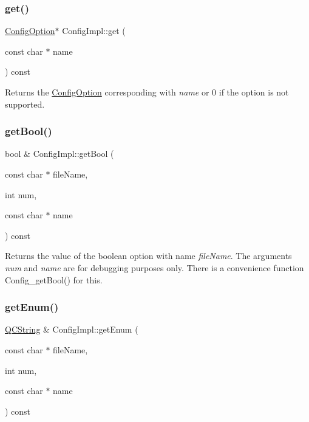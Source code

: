 \subsubsection{\texorpdfstring{get()}{get()}}
{\footnotesize\ttfamily \mbox{\hyperlink{class_config_option}{Config\+Option}}$\ast$ Config\+Impl\+::get (\begin{DoxyParamCaption}\item[{const char $\ast$}]{name }\end{DoxyParamCaption}) const\hspace{0.3cm}{\ttfamily [inline]}}

Returns the \mbox{\hyperlink{class_config_option}{Config\+Option}} corresponding with {\itshape name} or 0 if the option is not supported. \mbox{\label{class_config_impl_ad598f15be45d231f792b68314f7b0468}} 
\subsubsection{\texorpdfstring{getBool()}{getBool()}}
{\footnotesize\ttfamily bool \& Config\+Impl\+::get\+Bool (\begin{DoxyParamCaption}\item[{const char $\ast$}]{file\+Name,  }\item[{int}]{num,  }\item[{const char $\ast$}]{name }\end{DoxyParamCaption}) const}

Returns the value of the boolean option with name {\itshape file\+Name}. The arguments {\itshape num} and {\itshape name} are for debugging purposes only. There is a convenience function Config\+\_\+get\+Bool() for this. \mbox{\label{class_config_impl_a5c8800850fd2447c50f320ffb4ee0357}} 
\subsubsection{\texorpdfstring{getEnum()}{getEnum()}}
{\footnotesize\ttfamily \mbox{\hyperlink{class_q_c_string}{Q\+C\+String}} \& Config\+Impl\+::get\+Enum (\begin{DoxyParamCaption}\item[{const char $\ast$}]{file\+Name,  }\item[{int}]{num,  }\item[{const char $\ast$}]{name }\end{DoxyParamCaption}) const}

